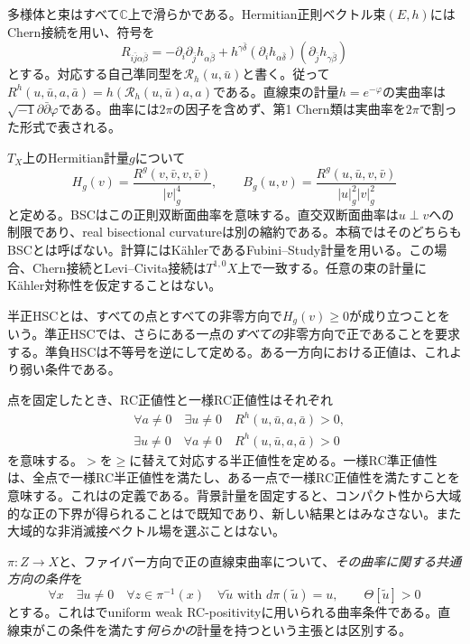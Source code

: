 \documentclass[12pt]{amsart}
\theoremstyle{definition}
\theoremstyle{remark}
\numberwithin{equation}{section}
\newcommand{\C}{\mathbb{C}}
\begin{document}
多様体と束はすべて$\C$上で滑らかである。Hermitian正則ベクトル束$(E,h)$にはChern接続を用い、符号を
\begin{equation}\label{ja:chern}
R_{i\bar j\alpha\bar\beta}
=-\partial_i\partial_{\bar j}h_{\alpha\bar\beta}
+h^{\gamma\bar\delta}
 (\partial_i h_{\alpha\bar\delta})(\partial_{\bar j}h_{\gamma\bar\beta})
\end{equation}
とする。対応する自己準同型を$\mathcal R_h(u,\bar u)$と書く。従って$R^h(u,\bar u,a,\bar a)=h(\mathcal R_h(u,\bar u)a,a)$である。直線束の計量$h=e^{-\varphi}$の実曲率は$\sqrt{-1}\partial\bar\partial\varphi$である。曲率には$2\pi$の因子を含めず、第1 Chern類は実曲率を$2\pi$で割った形式で表される。

$T_X$上のHermitian計量$g$について
\[
H_g(v)=\frac{R^g(v,\bar v,v,\bar v)}{|v|_g^4},\qquad
B_g(u,v)=\frac{R^g(u,\bar u,v,\bar v)}{|u|_g^2|v|_g^2}
\]
と定める。BSCはこの正則双断面曲率を意味する。直交双断面曲率は$u\perp v$への制限であり、real bisectional curvatureは別の縮約である。本稿ではそのどちらもBSCとは呼ばない。計算にはKählerであるFubini--Study計量を用いる。この場合、Chern接続とLevi--Civita接続は$T^{1,0}X$上で一致する。任意の束の計量にKähler対称性を仮定することはない。

半正HSCとは、すべての点とすべての非零方向で$H_g(v)\ge0$が成り立つことをいう。準正HSCでは、さらにある一点の\emph{すべての}非零方向で正であることを要求する。準負HSCは不等号を逆にして定める。ある一方向における正値は、これより弱い条件である。

点を固定したとき、RC正値性と一様RC正値性はそれぞれ
\begin{align*}
&\forall a\ne0\quad\exists u\ne0\quad R^h(u,\bar u,a,\bar a)>0,\\
&\exists u\ne0\quad\forall a\ne0\quad R^h(u,\bar u,a,\bar a)>0
\end{align*}
を意味する。$>$を$\ge$に替えて対応する半正値性を定める。一様RC準正値性は、全点で一様RC半正値性を満たし、ある一点で一様RC正値性を満たすことを意味する。これは\cite[Definition~1.1]{ja:Y20}の定義である。背景計量を固定すると、コンパクト性から大域的な正の下界が得られることは\cite[Proposition~2.9]{ja:Y20}で既知であり、新しい結果とはみなさない。また大域的な非消滅接ベクトル場を選ぶことはない。

$\pi:Z\to X$と、ファイバー方向で正の直線束曲率について、\emph{その曲率に関する共通方向の条件}を
\begin{equation}\label{ja:common}
\forall x\quad\exists u\ne0\quad
\forall z\in\pi^{-1}(x)\quad\forall\widetilde u\text{ with }d\pi(\widetilde u)=u,
\qquad\Theta[\widetilde u]>0
\end{equation}
とする。これは\cite[Definition~2]{ja:Wu26}でuniform weak RC-positivityに用いられる曲率条件である。直線束がこの条件を満たす\emph{何らかの}計量を持つという主張とは区別する。
\end{document}
